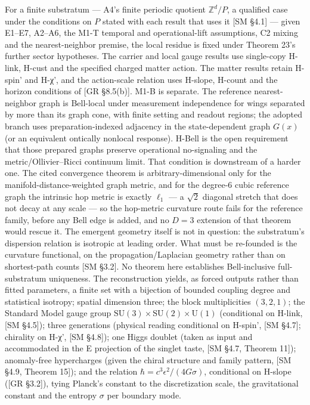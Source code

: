 \documentclass[
]{article}
\begin{document}
For a finite substratum --- A4's finite periodic quotient
\(\mathbb{Z}^d/P\), a qualified case under the conditions on \(P\)
stated with each result that uses it {[}SM §4.1{]} --- given E1--E7,
A2--A6, the M1-T temporal and operational-lift assumptions, C2 mixing
and the nearest-neighbor premise, the local residue is fixed under
Theorem 23's further sector hypotheses. The carrier and local gauge
results use single-copy H-link, H-cust and the specified charged matter
action. The matter results retain H-spin' and H-χ', and the action-scale
relation uses H-slope, H-count and the horizon conditions of {[}GR
§8.5(b){]}. M1-B is separate. The reference nearest-neighbor graph is
Bell-local under measurement independence for wings separated by more
than its graph cone, with finite setting and readout regions; the
adopted branch uses preparation-indexed adjacency in the state-dependent
graph \(G(x)\) (or an equivalent ontically nonlocal response). H-Bell is
the open requirement that those prepared graphs preserve operational
no-signaling and the metric/Ollivier--Ricci continuum limit. That
condition is downstream of a harder one. The cited convergence theorem
is arbitrary-dimensional only for the manifold-distance-weighted graph
metric, and for the degree-\(6\) cubic reference graph the intrinsic hop
metric is exactly \(\ell_1\) --- a \(\sqrt2\) diagonal stretch that does
not decay at any scale --- so the hop-metric curvature route fails for
the reference family, before any Bell edge is added, and no \(D=3\)
extension of that theorem would rescue it. The emergent geometry itself
is not in question: the substratum's dispersion relation is isotropic at
leading order. What must be re-founded is the curvature functional, on
the propagation/Laplacian geometry rather than on shortest-path counts
{[}SM §3.2{]}. No theorem here establishes Bell-inclusive
full-substratum uniqueness. The reconstruction yields, as forced outputs
rather than fitted parameters, a finite set with a bijection of bounded
coupling degree and statistical isotropy; spatial dimension three; the
block multiplicities \((3,2,1)\); the Standard Model gauge group
\(\mathrm{SU}(3)\times\mathrm{SU}(2)\times\mathrm{U}(1)\) (conditional
on H-link, {[}SM §4.5{]}); three generations (physical reading
conditional on H-spin', {[}SM §4.7{]}; chirality on H-χ', {[}SM
§4.8{]}); one Higgs doublet (taken as input and accommodated in the E
projection of the singlet taste, {[}SM §4.7, Theorem 11{]});
anomaly-free hypercharges (given the chiral structure and family
pattern, {[}SM §4.9, Theorem 15{]}); and the relation
\(\hbar = c^3\epsilon^2/(4G\sigma)\), conditional on H-slope ({[}GR
§3.2{]}), tying Planck's constant to the discretization scale, the
gravitational constant and the entropy \(\sigma\) per boundary mode.
\end{document}
